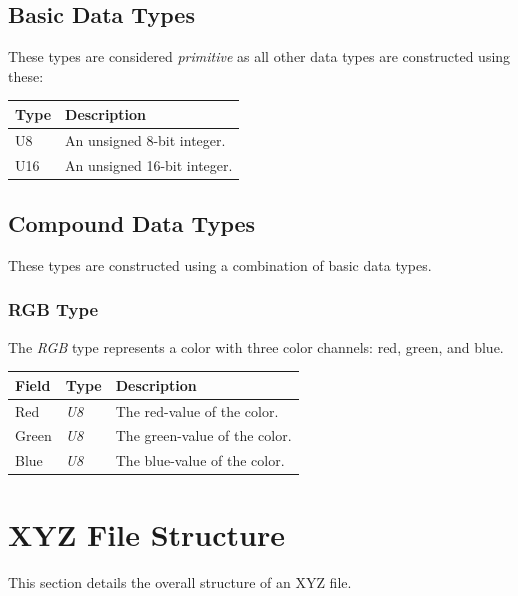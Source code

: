 \documentclass{article}
\begin{document}
\subsection{Basic Data Types}
These types are considered \textit{primitive} as all other data types are constructed using these:

\begin{table}[h!]
\centering
\begin{tabular}{|l|l|}
\hline
\textbf{Type} & \textbf{Description}        \\ \hline
U8            & An unsigned 8-bit integer.  \\ \hline
U16           & An unsigned 16-bit integer. \\ \hline
\end{tabular}
\end{table}

\subsection{Compound Data Types}
These types are constructed using a combination of basic data types.

\subsubsection{RGB Type}
The \textit{RGB} type represents a color with three color channels: red, green, and blue.

\begin{table}[h!]
\centering
\begin{tabular}{|l|l|l|}
\hline
\textbf{Field} & \textbf{Type} & \textbf{Description}          \\ \hline
Red            & \textit{U8}   & The red-value of the color.   \\ \hline
Green          & \textit{U8}   & The green-value of the color. \\ \hline
Blue           & \textit{U8}   & The blue-value of the color.  \\ \hline
\end{tabular}
\end{table}

\section{XYZ File Structure}
This section details the overall structure of an XYZ file.
\end{document}
